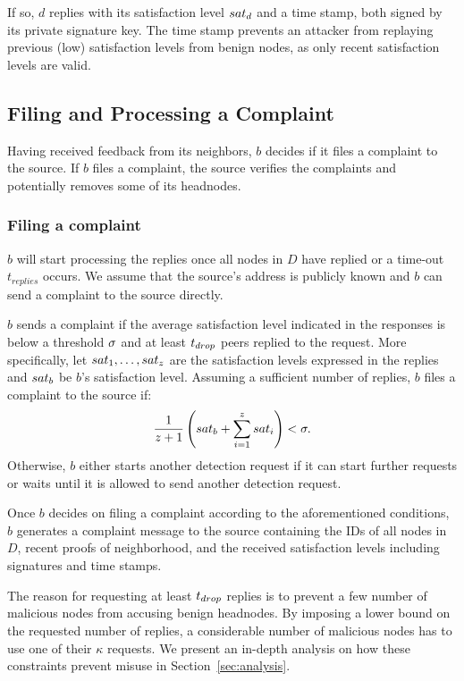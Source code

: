 If so, $d$ replies with its satisfaction level $sat_d$ and a time stamp, both signed by its private signature key. 
The time stamp prevents an attacker from replaying previous (low) satisfaction levels from benign nodes, as only recent satisfaction levels are valid.  


\subsection{Filing and Processing a Complaint}

Having received feedback from its neighbors, $b$ decides if it files a complaint to the source. If $b$ files a complaint, the source verifies the complaints and potentially removes some of its headnodes. 

\subsubsection*{Filing a complaint}
$b$ will start processing the replies once all nodes in $D$ have replied or a time-out $t_{replies}$ occurs. 
We assume that the source's address is publicly known and $b$ can send a complaint to the source directly.

$b$ sends a complaint if the average satisfaction level indicated in the responses is below a threshold $\sigma$ and at least $t_{drop}$ peers replied to the request. 
More specifically, let $sat_1, \ldots ,sat_z$ are the satisfaction levels expressed in the replies and $sat_b$ be $b$'s satisfaction level. 
Assuming a sufficient number of replies, $b$ files a complaint to the source if:
\begin{align}
\label{eq:drop_satis_equation}
\frac{1}{z+1}\left( \sat_b + \sum_{i=1}^{z} \sat_i \right) < \satThres. 
\end{align} 
Otherwise, $b$ either starts another detection request if it can start further requests or waits until it is allowed to send another detection request.

 

Once $b$ decides on filing a complaint according to the aforementioned conditions, $b$ generates a complaint message to the source containing the IDs of all nodes in $D$, recent proofs of neighborhood,  and the received satisfaction levels including signatures and time stamps.  


The reason for requesting at least $t_{drop}$ replies is to prevent a few number of malicious nodes from accusing benign headnodes. By imposing a lower bound on the requested number of replies, a considerable number of malicious nodes has to use one of their $\kappa$ requests. We present an in-depth analysis on how these constraints prevent misuse in Section~\ref{sec:analysis}. 





